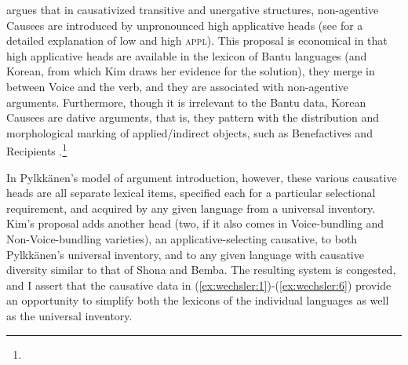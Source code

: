 \documentclass[output=paper]{langscibook}
\begin{document}
\citet{Kim2011} argues that in causativized transitive and unergative structures, non-agentive Causees are introduced by unpronounced high applicative heads (see  for a detailed explanation of low and high \textsc{appl).} This proposal is economical in that high applicative heads are available in the lexicon of Bantu languages (and Korean, from which Kim draws her evidence for the solution), they merge in between Voice and the verb, and they are associated with non-agentive arguments. Furthermore, though it is irrelevant to the Bantu data, Korean Causees are dative arguments, that is, they pattern with the distribution and morphological marking of applied/indirect objects, such as Benefactives and Recipients \citep{Kim2011}.\footnote{       } 


In Pylkkänen’s model of argument introduction, however, these various causative heads are all separate lexical items, specified each for a particular selectional requirement, and acquired by any given language from a universal inventory. Kim’s proposal adds another head (two, if it also comes in Voice-bundling and Non-Voice-bundling varieties), an applicative-selecting causative, to both Pylkkänen’s universal inventory, and to any given language with causative diversity similar to that of Shona and Bemba. The resulting system is congested, and I assert that the causative data in (\ref{ex:wechsler:1})-(\ref{ex:wechsler:6}) provide an opportunity to simplify both the lexicons of the individual languages as well as the universal inventory.
\end{document}
